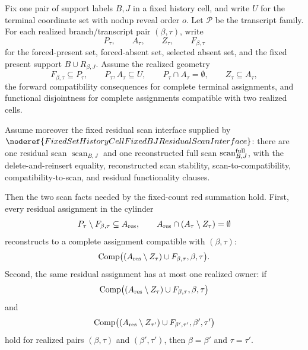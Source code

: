 \begin{helper}
Fix one pair of support labels \(B,J\) in a fixed history cell, and write
\(U\) for the terminal coordinate set with nodup reveal order \(o\).  Let
\(\mathcal P\) be the transcript family.  For each realized
branch/transcript pair \((\beta,\tau)\), write
\[
P_\tau,\qquad A_\tau,\qquad Z_\tau,\qquad F_{\beta,\tau}
\]
for the forced-present set, forced-absent set, selected absent set, and the
fixed present support \(B\cup R_{\beta,J}\).  Assume the realized geometry
\[
F_{\beta,\tau}\subseteq P_\tau,\qquad
P_\tau,A_\tau\subseteq U,\qquad
P_\tau\cap A_\tau=\emptyset,\qquad
Z_\tau\subseteq A_\tau ,
\]
the forward compatibility consequences for complete terminal assignments,
and functional disjointness for complete assignments compatible with two
realized cells.

Assume moreover the fixed residual scan interface supplied by
\(\noderef{FixedSetHistoryCellFixedBJResidualScanInterface}\): there are
one residual scan \(\operatorname{scan}_{B,J}\) and one reconstructed full
scan \(\operatorname{scan}^{\rm full}_{B,J}\), with the
delete-and-reinsert equality, reconstructed scan stability,
scan-to-compatibility, compatibility-to-scan, and residual functionality
clauses.

Then the two scan facts needed by the fixed-count red summation hold.
First, every residual assignment in the cylinder
\[
P_\tau\setminus F_{\beta,\tau}\subseteq A_{\rm res},\qquad
A_{\rm res}\cap(A_\tau\setminus Z_\tau)=\emptyset
\]
reconstructs to a complete assignment compatible with \((\beta,\tau)\):
\[
\operatorname{Comp}\bigl(
  (A_{\rm res}\setminus Z_\tau)\cup F_{\beta,\tau},
  \beta,\tau\bigr).
\]
Second, the same residual assignment has at most one realized owner: if
\[
\operatorname{Comp}\bigl(
  (A_{\rm res}\setminus Z_\tau)\cup F_{\beta,\tau},
  \beta,\tau\bigr)
\]
and
\[
\operatorname{Comp}\bigl(
  (A_{\rm res}\setminus Z_{\tau'})\cup F_{\beta',\tau'},
  \beta',\tau'\bigr)
\]
hold for realized pairs \((\beta,\tau)\) and \((\beta',\tau')\), then
\(\beta=\beta'\) and \(\tau=\tau'\).
\end{helper}
